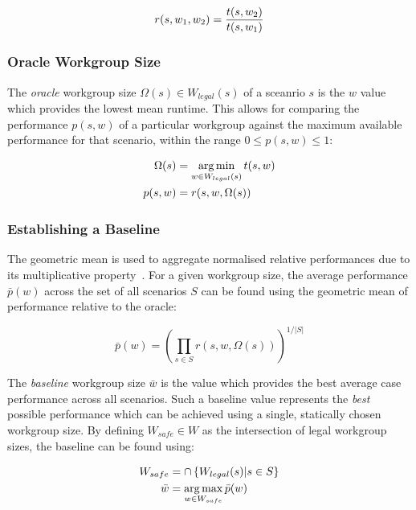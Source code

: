 \begin{equation}
  r(s, w_1, w_2) = \frac{t(s,w_2)}{t(s,w_1)}\\
\end{equation}


\subsubsection{Oracle Workgroup Size}

The \emph{oracle} workgroup size $\Omega(s) \in W_{legal}(s)$ of a
sceanrio $s$ is the $w$ value which provides the lowest mean
runtime. This allows for comparing the performance $p(s,w)$ of a
particular workgroup against the maximum available performance for
that scenario, within the range $0 \le p(s,w) \le 1$:

\begin{align}
  \Omega(s) &= \operatorname*{arg\,min}_{w \in W_{legal}(s)} t(s,w)\\
  p(s,w) &= r(s, w, \Omega(s))
\end{align}


\subsubsection{Establishing a Baseline}

The geometric mean is used to aggregate normalised relative
performances due to its multiplicative
property~\cite{Fleming1986}. For a given workgroup size, the average
performance $\bar{p}(w)$ across the set of all scenarios $S$ can be
found using the geometric mean of performance relative to the oracle:

\begin{equation}
\bar{p}(w) =
\left(
  \prod_{s \in S} r(s, w, \Omega(s))
\right)^{1/|S|}
\end{equation}

The \emph{baseline} workgroup size $\bar{w}$ is the value which
provides the best average case performance across all scenarios. Such
a baseline value represents the \emph{best} possible performance which
can be achieved using a single, statically chosen workgroup size. By
defining $W_{safe} \in W$ as the intersection of legal workgroup
sizes, the baseline can be found using:

\begin{align}
W_{safe} &= \cap \left\{ W_{legal}(s) | s \in S \right\}\\
\bar{w} &= \operatorname*{arg\,max}_{w \in W_{safe}} \bar{p}(w)
\end{align}


